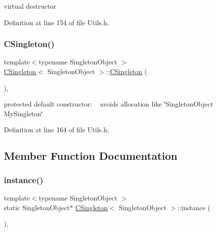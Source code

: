 virtual destructor 



Definition at line 154 of file Utils.\+h.

\mbox{\label{classCSingleton_aa03a7284f8092927696c3a94ef87cf31}} 
\subsubsection{\texorpdfstring{C\+Singleton()}{CSingleton()}}
{\footnotesize\ttfamily template$<$typename Singleton\+Object $>$ \\
\hyperlink{classCSingleton}{C\+Singleton}$<$ Singleton\+Object $>$\+::\hyperlink{classCSingleton}{C\+Singleton} (\begin{DoxyParamCaption}{ }\end{DoxyParamCaption})\hspace{0.3cm}{\ttfamily [inline]}, {\ttfamily [protected]}}



protected default constructor\+: ~\newline
 avoids allocation like \char`\"{}\+Singleton\+Object My\+Singleton\char`\"{} 



Definition at line 164 of file Utils.\+h.



\subsection{Member Function Documentation}
\mbox{\label{classCSingleton_a58f5ac3aaaea8079a373350594726bdf}} 
\subsubsection{\texorpdfstring{instance()}{instance()}}
{\footnotesize\ttfamily template$<$typename Singleton\+Object $>$ \\
static Singleton\+Object$\ast$ \hyperlink{classCSingleton}{C\+Singleton}$<$ Singleton\+Object $>$\+::instance (\begin{DoxyParamCaption}{ }\end{DoxyParamCaption})\hspace{0.3cm}{\ttfamily [inline]}, {\ttfamily [static]}}



